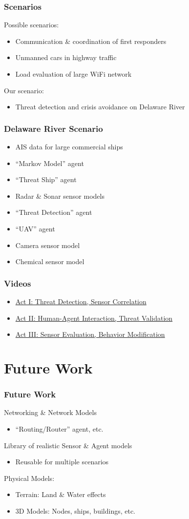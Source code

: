 \documentclass[mathserif,usenames,dvipsnames]{beamer}
\begin{document}
\frame
{
    \frametitle{Scenarios}
    Possible scenarios:
    \begin{itemize}
        \item Communication \& coordination of first responders
        \item Unmanned cars in highway traffic
        \item Load evaluation of large WiFi network
    \end{itemize}
    Our scenario:
    \begin{itemize}
        \item Threat detection and crisis avoidance on Delaware River
    \end{itemize} 
}

\frame
{
    \frametitle{Delaware River Scenario}
    \begin{itemize}
        \item AIS data for large commercial ships
        \item ``Markov Model'' agent
        \item ``Threat Ship'' agent
        \item Radar \& Sonar sensor models
        \item ``Threat Detection'' agent
        \item ``UAV'' agent
        \item Camera sensor model
        \item Chemical sensor model

    \end{itemize}
}

\frame
{
    \frametitle{Videos}
    \begin{itemize}
        \item \href{http://cs.drexel.edu/~dsi23/act1.ogv}{Act I: Threat Detection, Sensor Correlation}
        \item \href{http://cs.drexel.edu/~dsi23/act2.ogv}{Act II: Human-Agent Interaction, Threat Validation}
        \item \href{http://cs.drexel.edu/~dsi23/act3.ogv}{Act III: Sensor Evaluation, Behavior Modification}
    \end{itemize}
}

\section{Future Work}
\frame
{
    \frametitle{Future Work}
    Networking \& Network Models
    \begin{itemize}
        \item ``Routing/Router'' agent, etc.
    \end{itemize}
    Library of realistic Sensor \& Agent models
    \begin{itemize}
        \item Reusable for multiple scenarios 
    \end{itemize}
    Physical Models:
    \begin{itemize}
        \item Terrain: Land \& Water effects 
        \item 3D Models: Nodes, ships, buildings, etc.
    \end{itemize}
}
\end{document}

